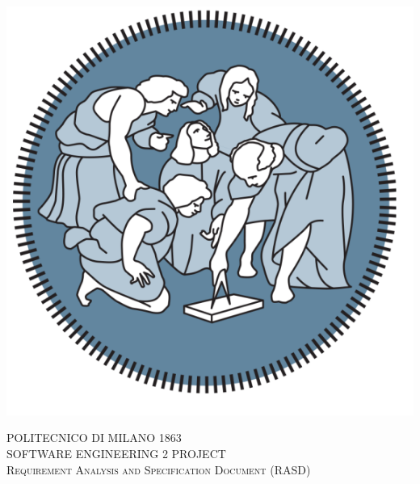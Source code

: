 




\begin{titlepage} %
	\newcommand{\HRule}{\rule{\linewidth}{0.5mm}} %

	\center %


	\begin{center} \includegraphics[scale=0.5]{Images/PolimiLogo1} \end{center}
	\textsc{\LARGE POLITECNICO DI MILANO 1863}\\[2cm]

	\textsc{\Large SOFTWARE ENGINEERING 2 PROJECT }\\[0.5cm]

	\textsc{\large Requirement Analysis and Specification Document (RASD)}\\[0.5cm]



\end{titlepage}
